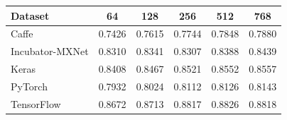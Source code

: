 \begin{tabular}{lccccc}
\toprule
Dataset & 64 & 128 & 256 & 512 & 768 \\
\midrule
Caffe & 0.7426 & 0.7615 & 0.7744 & 0.7848 & 0.7880 \\
Incubator-MXNet & 0.8310 & 0.8341 & 0.8307 & 0.8388 & 0.8439 \\
Keras & 0.8408 & 0.8467 & 0.8521 & 0.8552 & 0.8557 \\
PyTorch & 0.7932 & 0.8024 & 0.8112 & 0.8126 & 0.8143 \\
TensorFlow & 0.8672 & 0.8713 & 0.8817 & 0.8826 & 0.8818 \\
\bottomrule
\end{tabular}